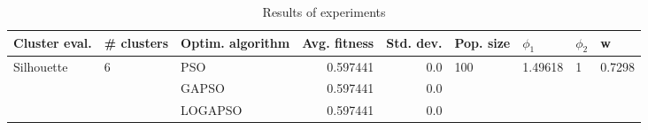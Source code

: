 \begin{table}
\centering
\caption{Results of experiments}
\begin{tabular}{lllrrllll}
\toprule
              Cluster eval. &        \# clusters & Optim. algorithm &  Avg. fitness &  Std. dev. &            Pop. size &               $\phi_{1}$ &         $\phi_{2}$ &                       w \\
\midrule
\multirow{3}{*}{Silhouette} & \multirow{3}{*}{6} &              PSO &      0.597441 &        0.0 & \multirow{3}{*}{100} & \multirow{3}{*}{1.49618} & \multirow{3}{*}{1} & \multirow{3}{*}{0.7298} \\
                            &                    &            GAPSO &      0.597441 &        0.0 &                      &                          &                    &                         \\
                            &                    &          LOGAPSO &      0.597441 &        0.0 &                      &                          &                    &                         \\
\bottomrule
\end{tabular}
\end{table}
